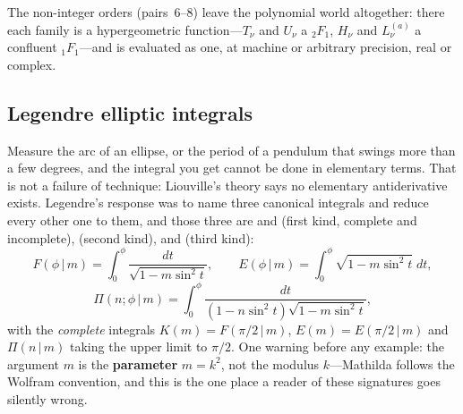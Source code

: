  The
non-integer orders (pairs~6--8) leave the polynomial world altogether: there each
family is a hypergeometric function---\(T_\nu\) and \(U_\nu\) a \({}_2F_1\), \(H_\nu\)
and \(L_\nu^{(a)}\) a confluent \({}_1F_1\)---and is evaluated as one, at machine or
arbitrary precision, real or complex.

\subsection{Legendre elliptic integrals}
\label{ssec:sf-elliptic}

Measure the arc of an ellipse, or the period of a pendulum that swings more than a
few degrees, and the integral you get cannot be done in elementary
terms. That is not a failure of technique: Liouville's
theory says no elementary antiderivative exists. Legendre's response was to name
three canonical integrals and reduce every other one to
them, and those three are
 and  (first kind, complete and incomplete), 
(second kind), and  (third kind):
\[
  F(\phi\,|\,m)=\int_0^\phi\frac{dt}{\sqrt{1-m\sin^2 t}},\qquad
  E(\phi\,|\,m)=\int_0^\phi\!\sqrt{1-m\sin^2 t}\;dt,
\]
\[
  \Pi(n;\phi\,|\,m)=\int_0^\phi\frac{dt}{(1-n\sin^2 t)\sqrt{1-m\sin^2 t}},
\]
with the \emph{complete} integrals \(K(m)=F(\pi/2\,|\,m)\), \(E(m)=E(\pi/2\,|\,m)\)
and \(\Pi(n\,|\,m)\) taking the upper limit to \(\pi/2\). One warning before any
example: the argument \(m\) is the \textbf{parameter} \(m=k^2\), not the modulus
\(k\)---Mathilda follows the Wolfram convention, and this is the one place a reader
of these signatures goes silently
wrong.

